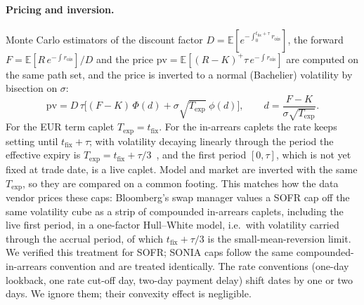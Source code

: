 \documentclass[11pt]{article}
\begin{document}
\paragraph{Pricing and inversion.} Monte Carlo estimators of the discount factor
\(D=\mathbb{E}[e^{-\int_0^{t_{\text{fix}}+\tau} r_{\text{ois}}}]\), the forward
\(F=\mathbb{E}[R\,e^{-\int r_{\text{ois}}}]/D\) and the price
\(\mathrm{pv}=\mathbb{E}[(R-K)^{+}\tau\, e^{-\int r_{\text{ois}}}]\) are computed on the same path
set, and the price is inverted to a normal (Bachelier) volatility by
bisection on \(\sigma\):
\begin{equation}
\mathrm{pv} = D\,\tau\Big[(F-K)\,\Phi(d) + \sigma\sqrt{T_{\text{exp}}}\;\phi(d)\Big],
\qquad d=\frac{F-K}{\sigma\sqrt{T_{\text{exp}}}} .
\end{equation}
For the EUR term caplet \(T_{\text{exp}}=t_{\text{fix}}\). For the in-arrears caplets the rate
keeps setting until \(t_{\text{fix}}+\tau\); with volatility decaying linearly through the
period the effective expiry is
\(T_{\text{exp}}=t_{\text{fix}}+\tau/3\)~\cite{lyashenko2019,henrard2026}, and the first period
\([0,\tau]\), which is not yet fixed at trade date, is a live caplet. Model and market are
inverted with the same \(T_{\text{exp}}\), so they are compared on a common footing. This
matches how the data vendor prices these caps: Bloomberg's swap manager values a SOFR cap off the
same volatility cube as a strip of compounded in-arrears caplets, including the live first period,
in a one-factor Hull--White model, i.e.\ with volatility carried through the accrual period, of
which \(t_{\text{fix}}+\tau/3\) is the small-mean-reversion limit. We verified this treatment for SOFR; SONIA
caps follow the same compounded-in-arrears convention and are treated identically. The rate conventions (one-day
lookback, one rate cut-off day, two-day payment delay) shift dates by one
or two days. We ignore them; their convexity effect is negligible.
\end{document}
